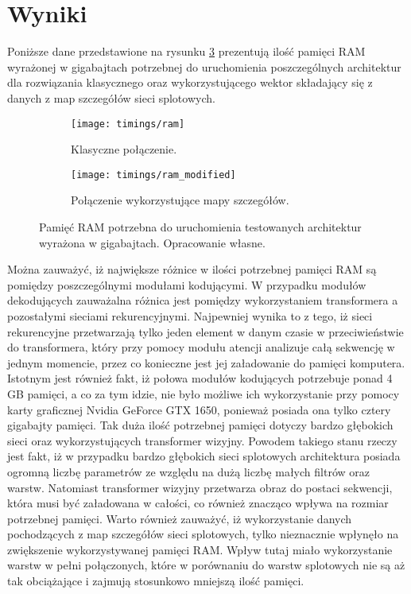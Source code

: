 \newpage %

\section{Wyniki}
Poniższe dane przedstawione na rysunku \ref{fig:memories} prezentują ilość pamięci RAM wyrażonej w gigabajtach potrzebnej do uruchomienia poszczególnych architektur dla rozwiązania klasycznego oraz wykorzystującego wektor składający się z danych z map szczegółów sieci splotowych.
\begin{figure}[H]
    \centering
    \begin{subfigure}{.5\textwidth}
        \centering
        \texttt{[image: timings/ram]}
        \caption{Klasyczne połączenie.}
        \label{fig:memory}
    \end{subfigure}%
    \centering
    \begin{subfigure}{.5\textwidth}
        \centering
        \texttt{[image: timings/ram\_modified]}
        \caption{Połączenie wykorzystujące mapy szczegółów.}
        \label{fig:memory-modified}
    \end{subfigure}%
    \caption{Pamięć RAM potrzebna do uruchomienia testowanych architektur wyrażona w gigabajtach. Opracowanie własne.}
    \label{fig:memories}
\end{figure}
\noindent Można zauważyć, iż największe różnice w ilości potrzebnej pamięci RAM są pomiędzy poszczególnymi modułami kodującymi. W przypadku modułów dekodujących zauważalna różnica jest pomiędzy wykorzystaniem transformera a pozostałymi sieciami rekurencyjnymi. Najpewniej wynika to z tego, iż sieci rekurencyjne przetwarzają tylko jeden element w danym czasie w przeciwieństwie do transformera, który przy pomocy modułu atencji analizuje całą sekwencję w jednym momencie, przez co konieczne jest jej załadowanie do pamięci komputera. Istotnym jest również fakt, iż połowa modułów kodujących potrzebuje ponad 4 GB pamięci, a co za tym idzie, nie było możliwe ich wykorzystanie przy pomocy karty graficznej Nvidia GeForce GTX 1650, ponieważ posiada ona tylko cztery gigabajty pamięci. Tak duża ilość potrzebnej pamięci dotyczy bardzo głębokich sieci oraz wykorzystujących transformer wizyjny. Powodem takiego stanu rzeczy jest fakt, iż w przypadku bardzo głębokich sieci splotowych architektura posiada ogromną liczbę parametrów ze względu na dużą liczbę małych filtrów oraz warstw. Natomiast transformer wizyjny przetwarza obraz do postaci sekwencji, która musi być załadowana w całości, co również znacząco wpływa na rozmiar potrzebnej pamięci. Warto również zauważyć, iż wykorzystanie danych pochodzących z map szczegółów sieci splotowych, tylko nieznacznie wpłynęło na zwiększenie wykorzystywanej pamięci RAM. Wpływ tutaj miało wykorzystanie warstw w pełni połączonych, które w porównaniu do warstw splotowych nie są aż tak obciążające i zajmują stosunkowo mniejszą ilość pamięci.

